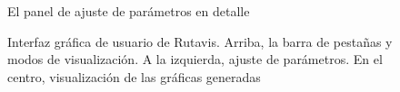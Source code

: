 \begin{figure}[hbtp]
  \centering
  \caption[Interfaz gráfica de Rutavis]{El panel de ajuste de parámetros en detalle}
  \label{fig:rutavis2}
\end{figure}

\begin{figure}[hbtp]
  \centering
  \caption[Interfaz gráfica de Rutavis]{Interfaz gráfica de usuario de Rutavis. Arriba, la barra de pestañas y modos de visualización. A la izquierda, ajuste de parámetros. En el centro, visualización de las gráficas generadas}
  \label{fig:rutavis1}
\end{figure}

